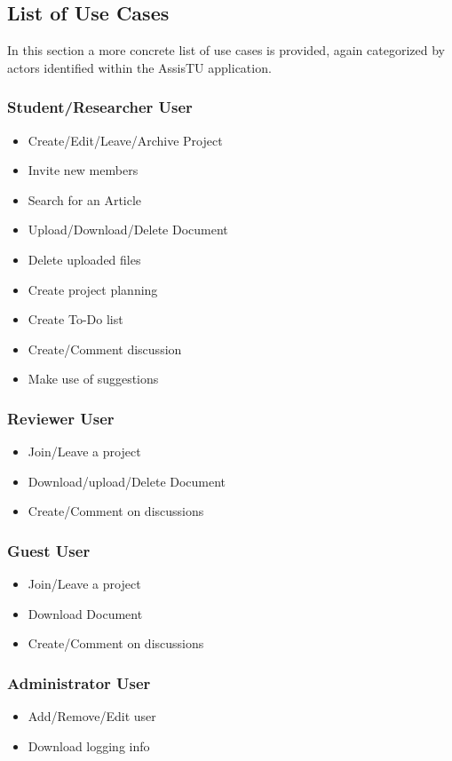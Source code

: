 \subsection{List of Use Cases} %
\label{sub:list_of_use_cases}
In this section a more concrete list of use cases is provided, again categorized by actors identified within the AssisTU application.
\subsubsection{Student/Researcher User} 
\begin{itemize}
	\item Create/Edit/Leave/Archive Project
	\item Invite new members
	\item Search for an Article
	\item Upload/Download/Delete Document
	\item Delete uploaded files
	\item Create project planning
	\item Create To-Do list
	\item Create/Comment discussion
	\item Make use of suggestions
\end{itemize}
\subsubsection{Reviewer User} 
\begin{itemize}
	\item Join/Leave a project
	\item Download/upload/Delete Document
	\item Create/Comment on discussions
\end{itemize}

\subsubsection{Guest User} 
\begin{itemize}
	\item Join/Leave a project
	\item Download Document
	\item Create/Comment on discussions
\end{itemize}	

\subsubsection{Administrator User} 
\begin{itemize}
	\item Add/Remove/Edit user	
	\item Download logging info
\end{itemize}

